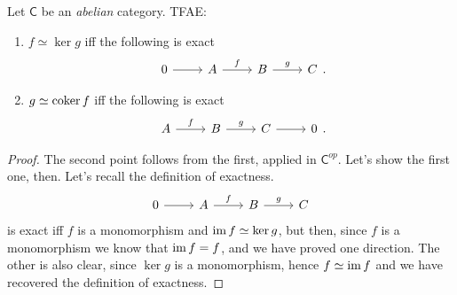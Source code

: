 \documentclass[../Main]{subfiles}
\begin{document}
\begin{lem}
	Let $\mathsf{C}$ be an {\em abelian} category. TFAE:
	\begin{enumerate}
		\item $f \simeq \ker g$ iff the following is exact
			\begin{equation}
			\begin{tikzcd}
				0 \arrow[r, "", rightarrow] &
				A \arrow[r, "f", rightarrow] &
				B \arrow[r, "g", rightarrow] &
				C
			\end{tikzcd}
			.\end{equation} 
		\item $g \simeq \operatorname{coker} f$ iff the following is exact
			\begin{equation}
			\begin{tikzcd}
				A \arrow[r, "f", rightarrow] &
				B \arrow[r, "g", rightarrow] &
				C \arrow[r, "", rightarrow] &
				0
			\end{tikzcd}
			.\end{equation} 
	\end{enumerate}
\end{lem} 
\begin{proof}
	The second point follows from the first, applied in $\mathsf{C}^{op}$.
	Let's show the first one, then.
	Let's recall the definition of exactness.
			\begin{equation}
			\begin{tikzcd}
				0 \arrow[r, "", rightarrow] &
				A \arrow[r, "f", rightarrow] &
				B \arrow[r, "g", rightarrow] &
				C
			\end{tikzcd}
			\end{equation} 
	is exact iff $f$ is a monomorphism and $\operatorname{im} f \simeq \ker g$,
	but then, since $f$ is a monomorphism we know that $\operatorname{im} f = f$, and we have proved one direction.
	The other is also clear, since $\ker g$ is a monomorphism, hence
	$f \simeq \operatorname{im} f$ and we have recovered the definition of exactness.
\end{proof}
\end{document}
